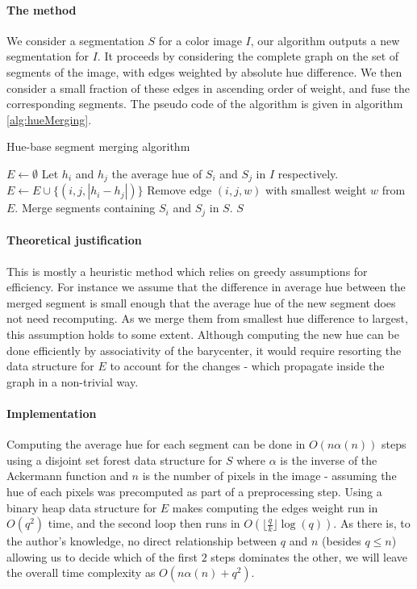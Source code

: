 \paragraph{The method} We consider a segmentation $S$ for a color image $I$, our algorithm outputs a new segmentation for $I$. It proceeds by considering the complete graph on the set of segments of the image, with edges weighted by absolute hue difference. We then consider a small fraction of these edges in ascending order of weight, and fuse the corresponding segments. The pseudo code of the algorithm is given in algorithm \autoref{alg:hueMerging}.

\begin{algorithm}
\caption{Hue-base segment merging algorithm}
\label{alg:hueMerging}

\begin{algorithmic}[1]
\State $E \gets \emptyset$
\State Let $h_i$ and $h_j$ the average hue of $S_i$ and $S_j$ in $I$ respectively.
\State $E \gets E \cup \{(i, j, |h_i - h_j| )\}$
\EndFor
{}
\State Remove edge $(i,j,w)$ with smallest weight $w$ from $E$.
\State Merge segments containing $S_i$ and $S_j$ in $S$.
\EndFor
\Return $S$
\EndFunction
\end{algorithmic}
\end{algorithm}

\paragraph{Theoretical justification} This is mostly a heuristic method which relies on greedy assumptions for efficiency. For instance we assume that the difference in average hue between the merged segment is small enough that the average hue of the new segment does not need recomputing. As we merge them from smallest hue difference to largest, this assumption holds to some extent. Although computing the new hue can be done efficiently by associativity of the barycenter, it would require resorting the data structure for $E$ to account for the changes - which propagate inside the graph in a non-trivial way.

\paragraph{Implementation} Computing the average hue for each segment can be done in $O(n\alpha(n))$ steps using a disjoint set forest data structure for $S$ where $\alpha$ is the inverse of the Ackermann function and $n$ is the number of pixels in the image - assuming the hue of each pixels was precomputed as part of a preprocessing step. Using a binary heap data structure for $E$ makes computing the edges weight run in $O(q^2)$ time, and the second loop then runs in $O(\lfloor \frac{q}{k} \rfloor \log(q))$. As there is, to the author's knowledge, no direct relationship between $q$ and $n$ (besides $q \leq n$) allowing us to decide which of the first $2$ steps dominates the other, we will leave the overall time complexity as $O(n\alpha(n) + q^2)$.

